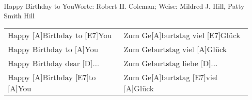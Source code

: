 \documentclass[../main.tex]{subfiles}
\begin{document}
\begin{songwithoutpagebreak}[4]{Happy Birthday to You}{Worte: Robert H. Coleman; Weise: Mildred J. Hill, Patty Smith Hill}{}
\setlength{\tabcolsep}{0em}\begin{tabular}{ p{} p{} }
Happy [A]Birthday to [E7]You & Zum Ge[A]burtstag viel [E7]Glück \\
Happy Birthday to [A]You & Zum Geburtstag viel [A]Glück\\
Happy Birthday dear [D]... & Zum Geburtstag liebe [D]...\\
Happy [A]Birthday [E7]to [A]You & Zum Ge[A]burtstag [E7]viel [A]Glück
\end{tabular}
\end{songwithoutpagebreak}
\end{document}
